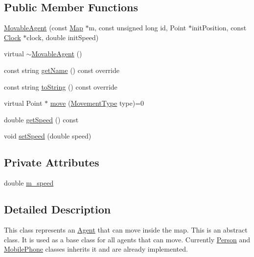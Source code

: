 \subsection*{Public Member Functions}
\begin{DoxyCompactItemize}
\item 
\mbox{\hyperlink{class_movable_agent_ad76b14a044181a57ade71f1267a2ccbd}{Movable\+Agent}} (const \mbox{\hyperlink{class_map}{Map}} $\ast$m, const unsigned long id, Point $\ast$init\+Position, const \mbox{\hyperlink{class_clock}{Clock}} $\ast$clock, double init\+Speed)
\item 
virtual \mbox{\hyperlink{class_movable_agent_a20eb9ddcc953137e63e035837918206c}{$\sim$\+Movable\+Agent}} ()
\item 
const string \mbox{\hyperlink{class_movable_agent_abcc1218876c39c996f2cb1eba2b96379}{get\+Name}} () const override
\item 
const string \mbox{\hyperlink{class_movable_agent_a1dee2a6bf93f01006fadfb6fba6c9a59}{to\+String}} () const override
\item 
virtual Point $\ast$ \mbox{\hyperlink{class_movable_agent_a35299e133c6787689b553d74ce5f98f0}{move}} (\mbox{\hyperlink{_movement_type_8h_a8a93b61bc797a7d1907f42796a252493}{Movement\+Type}} type)=0
\item 
double \mbox{\hyperlink{class_movable_agent_a12fcdaee60f5bb29f15fe113a7dacaac}{get\+Speed}} () const
\item 
void \mbox{\hyperlink{class_movable_agent_ae2ef452e81789a4370e7dee32a9cc67e}{set\+Speed}} (double speed)
\end{DoxyCompactItemize}
\subsection*{Private Attributes}
\begin{DoxyCompactItemize}
\item 
double \mbox{\hyperlink{class_movable_agent_ac725b42e7b968740a59c3e1033d69ac5}{m\+\_\+speed}}
\end{DoxyCompactItemize}


\subsection{Detailed Description}
This class represents an \mbox{\hyperlink{class_agent}{Agent}} that can move inside the map. This is an abstract class. It is used as a base class for all agents that can move. Currently \mbox{\hyperlink{class_person}{Person}} and \mbox{\hyperlink{class_mobile_phone}{Mobile\+Phone}} classes inherits it and are already implemented. 

